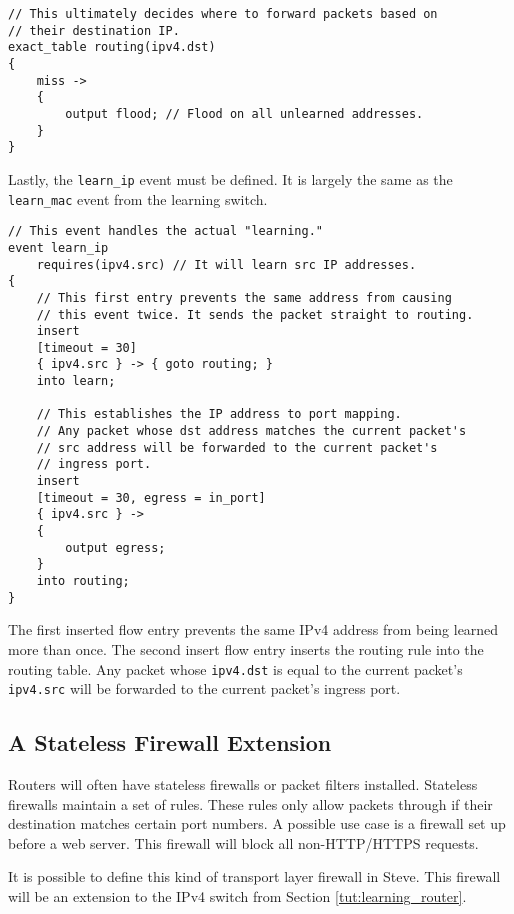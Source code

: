\begin{codepage}
\begin{lstlisting}
// This ultimately decides where to forward packets based on
// their destination IP.
exact_table routing(ipv4.dst)
{
	miss ->
	{
		output flood; // Flood on all unlearned addresses.
	}
}
\end{lstlisting}
\end{codepage}

Lastly, the \texttt{learn\_ip} event must be defined. It is
largely the same as the \texttt{learn\_mac} event from the learning switch.

\begin{codepage}
\begin{lstlisting}
// This event handles the actual "learning."
event learn_ip
	requires(ipv4.src) // It will learn src IP addresses.
{
	// This first entry prevents the same address from causing
	// this event twice. It sends the packet straight to routing.
	insert
	[timeout = 30]
	{ ipv4.src } -> { goto routing; }
	into learn;

	// This establishes the IP address to port mapping.
	// Any packet whose dst address matches the current packet's
	// src address will be forwarded to the current packet's
	// ingress port.
	insert
	[timeout = 30, egress = in_port]
	{ ipv4.src } ->
	{
		output egress;
	}
	into routing;
}
\end{lstlisting}
\end{codepage}

The first inserted flow entry prevents the same IPv4 address from being learned
more than once. The second insert flow entry inserts the routing rule into the
routing table. Any packet whose \texttt{ipv4.dst} is equal to the current
packet's \texttt{ipv4.src} will be forwarded to the current packet's ingress
port.

\subsection{A Stateless Firewall Extension} \label{tut:firewall}

Routers will often have stateless firewalls or packet filters installed. 
Stateless firewalls maintain a set of rules. These rules only allow packets 
through if their destination matches certain port numbers. A possible use 
case is a firewall set up before a web server. This firewall will block all 
non-HTTP/HTTPS requests.

It is possible to define this kind of transport layer firewall in Steve. This firewall will be an extension to the IPv4 switch from Section \ref{tut:learning_router}.

